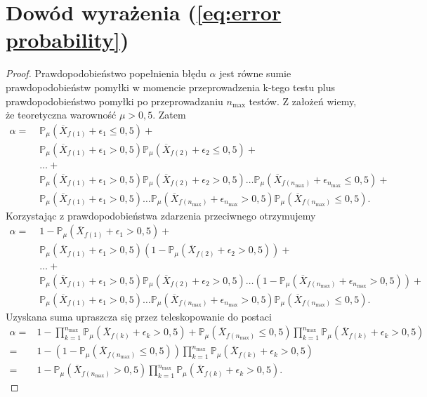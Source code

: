 \documentclass[inzynierska]{pwr_wmat_praca_dyplomowa}
\theoremstyle{plain}
\numberwithin{theorem}{chapter}
\theoremstyle{definition}
\numberwithin{theorem}{chapter}
\newcommand{\probP}{\mathbb{P}}
\newcommand{\nmax}{n_{\text{max}}}
\begin{document}
\section{Dowód wyrażenia (\ref{eq:error probability})}
\begin{proof}\label{proof:error probability}
	 Prawdopodobieństwo popełnienia błędu $\alpha$ jest równe sumie prawdopodobieństw pomyłki w momencie przeprowadzenia k-tego testu plus prawdopodobieństwo pomyłki po przeprowadzaniu $\nmax$ testów. Z założeń wiemy, że teoretyczna warowność $\mu > 0,5$. Zatem
	\begin{align*}
		\alpha=\;
		&\probP_{\mu}(\overline{X}_{f(1)} + \epsilon_{1} \le 0,5) + \\
		&\probP_{\mu}(\overline{X}_{f(1)} + \epsilon_{1} > 0,5)\probP_{\mu}(\overline{X}_{f(2)} + \epsilon_{2} \le 0,5) +\\
		&\dots +\\
		&\probP_{\mu}(\overline{X}_{f(1)} + \epsilon_{1} > 0,5)\probP_{\mu}(\overline{X}_{f(2)} + \epsilon_{2} > 0,5)\dots  \probP_{\mu}(\overline{X}_{f(\nmax)}+ \epsilon_{\nmax} \le 0,5)+\\
		&\probP_{\mu}(\overline{X}_{f(1)} + \epsilon_{1} > 0,5)\dots  \probP_{\mu}(\overline{X}_{f(\nmax)}+ \epsilon_{\nmax} > 0,5)\probP_{\mu}(\overline{X}_{f(\nmax)} \le 0,5).
	\end{align*}
	Korzystając z prawdopodobieństwa zdarzenia przeciwnego otrzymujemy
	\begin{align*}
		\alpha=\;
		&1 - \probP_{\mu}(\overline{X}_{f(1)} + \epsilon_{1} > 0,5) + \\
		&\probP_{\mu}(\overline{X}_{f(1)} + \epsilon_{1} > 0,5)(1 - \probP_{\mu}(\overline{X}_{f(2)} + \epsilon_{2} > 0,5)) +\\
		&\dots +\\
		&\probP_{\mu}(\overline{X}_{f(1)} + \epsilon_{1} > 0,5)\probP_{\mu}(\overline{X}_{f(2)} + \epsilon_{2} > 0,5)\dots  (1-\probP_{\mu}(\overline{X}_{f(\nmax)}+ \epsilon_{\nmax} > 0,5))+\\
		&\probP_{\mu}(\overline{X}_{f(1)} + \epsilon_{1} > 0,5)\dots  \probP_{\mu}(\overline{X}_{f(\nmax)}+ \epsilon_{\nmax} > 0,5)\probP_{\mu}(\overline{X}_{f(\nmax)} \le 0,5).
	\end{align*}
	Uzyskana suma upraszcza się przez teleskopowanie do postaci
	\begin{align*}
		\alpha =&  1- \prod^{\nmax}_{k=1} \probP_{\mu}(\overline{X}_{f(k)} +  \epsilon_{k} > 0,5)+ 
		\probP_{\mu}(\overline{X}_{f(\nmax)} \le 0,5)\prod^{\nmax}_{k=1} \probP_{\mu}(\overline{X}_{f(k)} +  \epsilon_{k} > 0,5)\\
		=& 1 - (1 - \probP_{\mu}(\overline{X}_{f(\nmax)} \le 0,5))
		\prod^{\nmax}_{k=1} \probP_{\mu}(\overline{X}_{f(k)} +  \epsilon_{k} > 0,5) \\
		=&1 -  \probP_{\mu}(\overline{X}_{f(\nmax)} > 0,5)
		\prod^{\nmax}_{k=1} \probP_{\mu}(\overline{X}_{f(k)} +  \epsilon_{k} > 0,5).
	\end{align*}
\end{proof}
\end{document}
